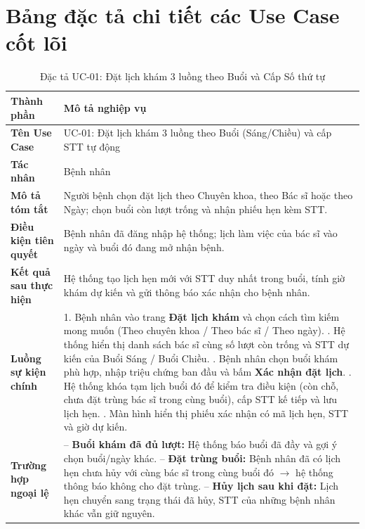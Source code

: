 \documentclass[12pt,a4paper]{report}
\begin{document}
\section{Bảng đặc tả chi tiết các Use Case cốt lõi}

\begin{table}[H]
  \centering
  \caption{Đặc tả UC-01: Đặt lịch khám 3 luồng theo Buổi và Cấp Số thứ tự}
  \begin{tabularx}{\textwidth}{@{}l X@{}}
    \toprule
    \textbf{Thành phần} & \textbf{Mô tả nghiệp vụ} \\
    \midrule
    \textbf{Tên Use Case} & UC-01: Đặt lịch khám 3 luồng theo Buổi (Sáng/Chiều) và cấp STT tự động \\
    \textbf{Tác nhân} & Bệnh nhân \\
    \textbf{Mô tả tóm tắt} & Người bệnh chọn đặt lịch theo Chuyên khoa, theo Bác sĩ hoặc theo Ngày; chọn buổi còn lượt trống và nhận phiếu hẹn kèm STT. \\
    \textbf{Điều kiện tiên quyết} & Bệnh nhân đã đăng nhập hệ thống; lịch làm việc của bác sĩ vào ngày và buổi đó đang mở nhận bệnh. \\
    \textbf{Kết quả sau thực hiện} & Hệ thống tạo lịch hẹn mới với STT duy nhất trong buổi, tính giờ khám dự kiến và gửi thông báo xác nhận cho bệnh nhân. \\
    \textbf{Luồng sự kiện chính} &
      1. Bệnh nhân vào trang \textbf{Đặt lịch khám} và chọn cách tìm kiếm mong muốn (Theo chuyên khoa / Theo bác sĩ / Theo ngày). \newline
      2. Hệ thống hiển thị danh sách bác sĩ cùng số lượt còn trống và STT dự kiến của Buổi Sáng / Buổi Chiều. \newline
      3. Bệnh nhân chọn buổi khám phù hợp, nhập triệu chứng ban đầu và bấm \textbf{Xác nhận đặt lịch}. \newline
      4. Hệ thống khóa tạm lịch buổi đó để kiểm tra điều kiện (còn chỗ, chưa đặt trùng bác sĩ trong cùng buổi), cấp STT kế tiếp và lưu lịch hẹn. \newline
      5. Màn hình hiển thị phiếu xác nhận có mã lịch hẹn, STT và giờ dự kiến. \\
    \textbf{Trường hợp ngoại lệ} &
      -- \textbf{Buổi khám đã đủ lượt:} Hệ thống báo buổi đã đầy và gợi ý chọn buổi/ngày khác. \newline
      -- \textbf{Đặt trùng buổi:} Bệnh nhân đã có lịch hẹn chưa hủy với cùng bác sĩ trong cùng buổi đó $\rightarrow$ hệ thống thông báo không cho đặt trùng. \newline
      -- \textbf{Hủy lịch sau khi đặt:} Lịch hẹn chuyển sang trạng thái đã hủy, STT của những bệnh nhân khác vẫn giữ nguyên. \\
    \bottomrule
  \end{tabularx}
\end{table}
\end{document}
